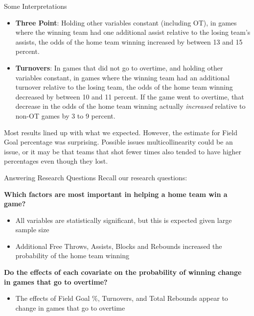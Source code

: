 \documentclass{beamer}
\begin{document}
\begin{frame}{Some Interpretations}
 
\begin{itemize}
	\item \textbf{Three Point}: Holding other variables constant (including OT), in games where the winning team had one additional assist relative to the losing team's assists, the odds of the home team winning increased by between 13 and 15 percent. 
	\item \textbf{Turnovers}: In games that did not go to overtime, and holding other variables constant, in games where the winning team had an additional turnover relative to the losing team, the odds of the home team winning decreased by between 10 and 11 percent. If the game went to overtime, that decrease in the odds of the home team winning actually \textit{increased} relative to non-OT games by 3 to 9 percent. 
	

\end{itemize}
Most results lined up with what we expected. However, the estimate for Field Goal percentage was surprising. Possible issues multicollinearity could be an issue, or it may be that teams that shot fewer times also tended to have higher percentages even though they lost.  


\end{frame}
	
	
	
\begin{frame}{Answering Research Questions}
Recall our research questions: 

\textbf{Which factors are most important in helping a home team win a game?}
\begin{itemize}
	\item All variables are statistically significant, but this is expected given large sample size
	\item Additional Free Throws, Assists, Blocks and Rebounds increased the probability of the home team winning
	\end{itemize}
		
\textbf{Do the effects of each covariate on the probability of winning change in games that go to overtime?}
\begin{itemize}
	\item The effects of Field Goal \%, Turnovers, and Total Rebounds appear to change in games that go to overtime
\end{itemize}



\end{frame}	
\end{document}
